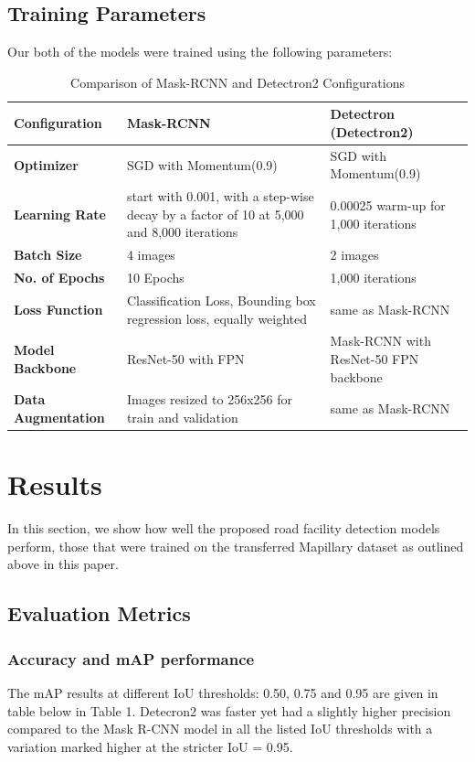 \documentclass[conference]{IEEEtran}
\begin{document}
\subsection{Training Parameters}
Our both of the models were trained using the following parameters:\\

\begin{table}[htbp]
    \centering
    \caption{Comparison of Mask-RCNN and Detectron2 Configurations}
    \label{table}
    \begin{tabular}{|p{2cm}|p{2.4cm}|p{2.9cm}|}
    \hline
    \textbf{Configuration}&\textbf{Mask-RCNN}&\textbf{Detectron (Detectron2)}\\
    \hline
    \textbf{Optimizer} & SGD with Momentum(0.9) & SGD with Momentum(0.9)\\
    \hline
    \textbf{Learning Rate} & start with 0.001, with a step-wise decay by a factor of 10 at 5,000 and 8,000 iterations & 0.00025 warm-up for 1,000 iterations\\ 
    \hline
    \textbf{Batch Size} & 4 images & 2 images\\
    \hline
    \textbf{No. of Epochs} & 10 Epochs & 1,000 iterations\\
    \hline
    \textbf{Loss Function} & Classification Loss, Bounding box regression loss, equally weighted & same as Mask-RCNN\\
    \hline
    \textbf{Model Backbone} & ResNet-50 with FPN & Mask-RCNN with ResNet-50 FPN backbone\\
    \hline
    \textbf{Data Augmentation} & Images resized to 256x256 for train and validation & same as Mask-RCNN \\
    \hline
    \end{tabular}
\end{table}


\section{Results}
In this section, we show how well the proposed road facility detection models perform, those that were trained on the transferred Mapillary dataset as outlined above in this paper. 

\subsection{Evaluation Metrics}
\subsubsection{Accuracy and mAP performance}
The mAP results at different IoU thresholds: 0.50, 0.75 and 0.95 are given in table below in Table 1. Detecron2 was faster yet had a slightly higher precision compared to the Mask R-CNN model in all the listed IoU thresholds with a variation marked higher at the stricter IoU = 0.95.
\end{document}
